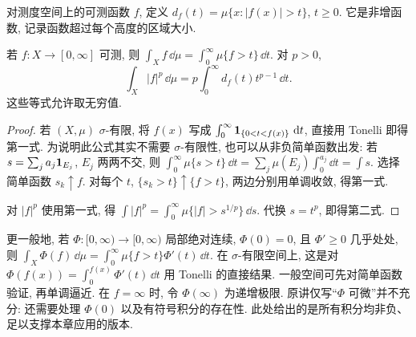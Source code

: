 \begin{definition}[分布函数]
对测度空间上的可测函数 $f$, 定义 $d_f(t)=\mu\{x:|f(x)|>t\}$, $t\ge0$. 它是非增函数, 记录函数超过每个高度的区域大小.
\end{definition}

\begin{theorem}[分层积分公式]\label{ra:c8:layercake}
若 $f:X\to[0,\infty]$ 可测, 则 $\int_Xf\,\dd\mu=\int_0^\infty\mu\{f>t\}\,\dd t$. 对 $p>0$,
\[
 \int_X|f|^p\,\dd\mu
 =p\int_0^\infty d_f(t)t^{p-1}\,\dd t.
\]
这些等式允许取无穷值.
\end{theorem}
\begin{proof}
若 $(X,\mu)$ $\sigma$-有限, 将 $f(x)$ 写成 $\int_0^\infty\mathbf 1_{\{0<t<f(x)\}}\,\,\mathrm d t$, 直接用 Tonelli 即得第一式. 为说明此公式其实不需要 $\sigma$-有限性, 也可以从非负简单函数出发: 若 $s=\sum_ja_j\mathbf 1_{E_j}$, $E_j$ 两两不交, 则
$\int_0^\infty\mu\{s>t\}\,\dd t=\sum_j\mu(E_j)\int_0^{a_j}\dd t=\int s$.
选择简单函数 $s_k\uparrow f$. 对每个 $t$, $\{s_k>t\}\uparrow\{f>t\}$, 两边分别用单调收敛, 得第一式.

对 $|f|^p$ 使用第一式, 得 $\int|f|^p=\int_0^\infty\mu\{|f|>s^{1/p}\}\,\dd s$. 代换 $s=t^p$, 即得第二式.
\end{proof}

更一般地, 若 $\Phi:[0,\infty)\to[0,\infty)$ 局部绝对连续, $\Phi(0)=0$, 且 $\Phi'\ge0$ 几乎处处, 则
$\int_X\Phi(f)\,\dd\mu=\int_0^\infty\mu\{f>t\}\Phi'(t)\,\dd t$.
在 $\sigma$-有限空间上, 这是对 $\Phi(f(x))=\int_0^{f(x)}\Phi'(t)\,\dd t$ 用 Tonelli 的直接结果. 一般空间可先对简单函数验证, 再单调逼近. 在 $f=\infty$ 时, 令 $\Phi(\infty)$ 为递增极限. 原讲仅写“$\Phi$ 可微”并不充分: 还需要处理 $\Phi(0)$ 以及有符号积分的存在性. 此处给出的是所有积分均非负、足以支撑本章应用的版本.

